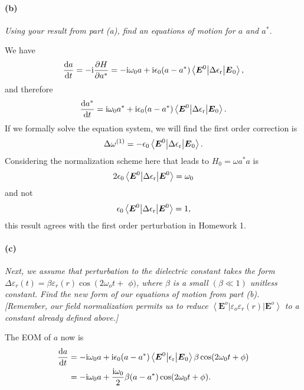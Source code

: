 \documentclass[hyperref, a4paper]{article}
\newcommand*{\ii}{\mathrm{i}}
\newcommand{\epsr}{\epsilon_{\text{r}}}
\begin{document}
\paragraph*{(b)} \textit{Using your result from part (a), find an equations of motion for $a$ and $a^*$.} 

We have 
\begin{equation}
    \dv{a}{t} = - \ii \pdv{H}{a^*} 
    = - \ii \omega_0 a + \ii \epsilon_0 (a - a^*) \mel**{\vb*{E}^0}{\Delta \epsr}{\vb*{E}_0},
\end{equation}
and therefore 
\begin{equation}
    \dv{a^*}{t} = \ii \omega_0 a^* + \ii \epsilon_0 (a - a^*) \mel**{\vb*{E}^0}{\Delta \epsr}{\vb*{E}_0}.
\end{equation}
If we formally solve the equation system, we will find the first order correction is 
\begin{equation}
    \Delta \omega^{(1)} = - \epsilon_0 \mel**{\vb*{E}^0}{\Delta \epsr}{\vb*{E}_0}.
\end{equation}
Considering the normalization scheme here that leads to $H_0 = \omega a^* a$ is 
\begin{equation}
    2 \epsilon_0 \mel**{\vb*{E}^0}{\Delta \epsr}{\vb*{E}^0} = \omega_0
    \label{eq:normalization-e}
\end{equation}
and not 
\begin{equation}
    \epsilon_0 \mel**{\vb*{E}^0}{\Delta \epsr}{\vb*{E}^0} = 1,
\end{equation}
this result agrees with the first order perturbation in Homework 1. 

\paragraph*{(c)} \textit{Next, we assume that perturbation to the dielectric constant takes the form $\Delta \varepsilon_r(t)=\beta \varepsilon_r(r) \cos \left(2 \omega_o t+\right.$ $\phi)$, where $\beta$ is a small $(\beta \ll 1)$ unitless constant. Find the new form of our equations of motion from part (b). [Remember, our field normalization permits us to reduce $\left\langle\mathbf{E}^o\left|\varepsilon_o \varepsilon_r(r)\right| \mathbf{E}^o\right\rangle$ to a constant already defined above.]} 

The EOM of $a$ now is 
\begin{equation}
    \begin{aligned}
        \dv{a}{t} &= - \ii \omega_0 a + \ii \epsilon_0 (a - a^*) \mel**{\vb*{E}^0}{\epsr}{\vb*{E}_0} \beta \cos (2 \omega_0 t + \phi) \\
        &= - \ii \omega_0 a + \frac{\ii \omega_0}{2} \beta (a - a^*) \cos (2 \omega_0 t + \phi).
    \end{aligned}
\end{equation}
\end{document}
